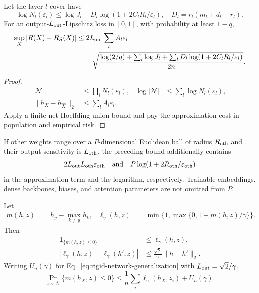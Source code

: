 \begin{theorem}
\label{thm:network-generalization}
Let the layer-$l$ cover have
\begin{equation}
\log N_l(\varepsilon_l)
\leq\log J_l+D_l\log(1+2C_lR_l/\varepsilon_l),\quad
D_l=r_l(m_l+d_l-r_l).
\end{equation}
For an output-$L_{\rm out}$-Lipschitz loss in $[0,1]$,
with probability at least $1-q$,
\begin{align}
\sup_X|R(X)-R_S(X)|
&\leq2L_{\rm out}\sum_l A_l\varepsilon_l\notag\\
&\quad+\sqrt{\frac{
\log(2/q)+\sum_l\log J_l+
\sum_lD_l\log(1+2C_lR_l/\varepsilon_l)}
{2n}} .
\label{eq:rigid-network-generalization}
\end{align}
\end{theorem}
\begin{proof}
\begin{align}
|\mathcal N|&\leq\prod_lN_l(\varepsilon_l),&
\log|\mathcal N|&\leq\sum_l\log N_l(\varepsilon_l),\\
\|h_X-h_{\widehat X}\|_2&\leq\sum_lA_l\varepsilon_l .
\end{align}
Apply a finite-net Hoeffding union bound and pay the approximation
cost in population and empirical risk.
\end{proof}

\begin{corollary}
If other weights range over a $P$-dimensional Euclidean ball of radius
$R_{\rm oth}$ and their output sensitivity is $L_{\rm oth}$, the preceding
bound additionally contains
\begin{align}
2L_{\rm out}L_{\rm oth}\varepsilon_{\rm oth}
\quad\text{and}\quad
P\log(1+2R_{\rm oth}/\varepsilon_{\rm oth})
\end{align}
in the approximation term and the logarithm, respectively.
Trainable embeddings, dense backbones, biases, and attention parameters
are not omitted from $P$.
\end{corollary}

\begin{corollary}
Let
\begin{align}
m(h,z)&=h_y-\max_{k\ne y}h_k,&
\ell_\gamma(h,z)&=\min\{1,\max\{0,1-m(h,z)/\gamma\}\}.
\end{align}
Then
\begin{align}
\mathbf1_{\{m(h,z)\leq0\}}&\leq\ell_\gamma(h,z),\\
|\ell_\gamma(h,z)-\ell_\gamma(h',z)|
&\leq\frac{\sqrt2}{\gamma}\|h-h'\|_2 .
\end{align}
Writing $U_n(\gamma)$ for Eq.~\eqref{eq:rigid-network-generalization}
with $L_{\rm out}=\sqrt2/\gamma$,
\begin{equation}
\Pr_{z\sim\mathcal D}\{m(h_X,z)\leq0\}
\leq\frac1n\sum_i\ell_\gamma(h_X,z_i)+U_n(\gamma).
\end{equation}
\end{corollary}

